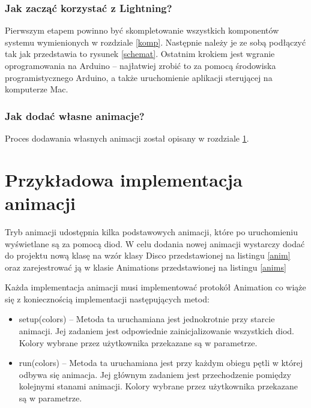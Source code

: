 \documentclass[12pt]{report}
\begin{document}
\subsubsection{Jak zacząć korzystać z Lightning?}

Pierwszym etapem powinno być skompletowanie wszystkich komponentów systemu wymienionych w rozdziale \ref{komp}. Następnie należy je ze sobą podłączyć tak jak przedstawia to rysunek \ref{schemat}. Ostatnim krokiem jest wgranie oprogramowania na Arduino -- najłatwiej zrobić to za pomocą środowiska programistycznego Arduino, a także uruchomienie aplikacji sterującej na komputerze Mac. 

\subsubsection{Jak dodać własne animacje?}

Proces dodawania własnych animacji został opisany w rozdziale  \ref{animacje}.

\section{Przykładowa implementacja animacji} \label{animacje}

Tryb animacji udostępnia kilka podstawowych animacji, które po uruchomieniu wyświetlane są za pomocą diod. W celu dodania nowej animacji wystarczy dodać do projektu nową klasę na wzór klasy Disco przedstawionej na listingu \ref{anim} oraz zarejestrować ją w klasie Animations przedstawionej na listingu \ref{anims}

 \label{anim}

Każda implementacja animacji musi implementować protokół Animation co wiąże się z koniecznością implementacji następujących metod:

\begin{itemize}
	\item setup(colors) -- Metoda ta uruchamiana jest jednokrotnie przy starcie animacji. Jej zadaniem jest odpowiednie zainicjalizowanie wszystkich diod. Kolory wybrane przez użytkownika przekazane są w parametrze.
	\item run(colors) -- Metoda ta uruchamiana jest przy każdym obiegu pętli w której odbywa się animacja. Jej głównym zadaniem jest przechodzenie pomiędzy kolejnymi stanami animacji. Kolory wybrane przez użytkownika przekazane są w parametrze.
\end{itemize}
\end{document}
